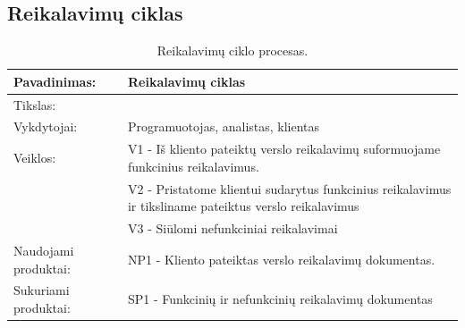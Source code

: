 \documentclass{VUMIFPSkursinis}
\begin{document}
	\subsection{Reikalavimų ciklas}
	
		\begin{center}
			\begin{table}[ht]
				\caption{Reikalavimų ciklo procesas.}
					\begin{tabular}{ | l | l | } 
						\hline
							Pavadinimas:         & Reikalavimų ciklas                                      \\ \hline
							Tikslas: 	           & 							\\ \hline
							Vykdytojai:          & Programuotojas, analistas, klientas                            \\ \hline
							Veiklos:             & V1 - Iš kliento pateiktų verslo reikalavimų suformuojame funkcinius reikalavimus. 													\\
											 & V2 - Pristatome klientui sudarytus funkcinius reikalavimus ir tiksliname pateiktus verslo reikalavimus \\
											 & V3 - Siūlomi nefunkciniai reikalavimai												\\ \hline
							Naudojami produktai: & NP1 - Kliento pateiktas verslo reikalavimų dokumentas.													 \\ \hline
							Sukuriami produktai: & SP1 - Funkcinių ir nefunkcinių reikalavimų dokumentas								\\ \hline
					\end{tabular}
			\end{table}
		\end{center}
		
		
\end{document}
